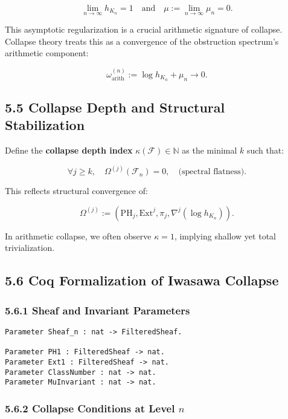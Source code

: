 \documentclass[11pt]{article}
\begin{document}
\[
\lim_{n \to \infty} h_{K_n} = 1
\quad \text{and} \quad
\mu := \lim_{n \to \infty} \mu_n = 0.
\]

This asymptotic regularization is a crucial arithmetic signature of collapse. Collapse theory treats this as a convergence of the obstruction spectrum’s arithmetic component:

\[
\omega_{\mathrm{arith}}^{(n)} := \log h_{K_n} + \mu_n \longrightarrow 0.
\]

\subsection*{5.5 Collapse Depth and Structural Stabilization}

Define the \textbf{collapse depth index} \( \kappa(\mathcal{F}) \in \mathbb{N} \) as the minimal \( k \) such that:

\[
\forall j \geq k, \quad \Omega^{(j)}(\mathcal{F}_n) = 0,
\quad \text{(spectral flatness)}.
\]

This reflects structural convergence of:

\[
\Omega^{(j)} := \left( \mathrm{PH}_j, \mathrm{Ext}^j, \pi_j, \nabla^j(\log h_{K_n}) \right).
\]

In arithmetic collapse, we often observe \( \kappa = 1 \), implying shallow yet total trivialization.

\subsection*{5.6 Coq Formalization of Iwasawa Collapse}

\subsubsection*{5.6.1 Sheaf and Invariant Parameters}

\begin{lstlisting}[language=Coq, caption=Iwasawa Collapse Setup, captionpos=b]
Parameter Sheaf_n : nat -> FilteredSheaf.

Parameter PH1 : FilteredSheaf -> nat.
Parameter Ext1 : FilteredSheaf -> nat.
Parameter ClassNumber : nat -> nat.
Parameter MuInvariant : nat -> nat.
\end{lstlisting}

\subsubsection*{5.6.2 Collapse Conditions at Level \( n \)}
\end{document}
